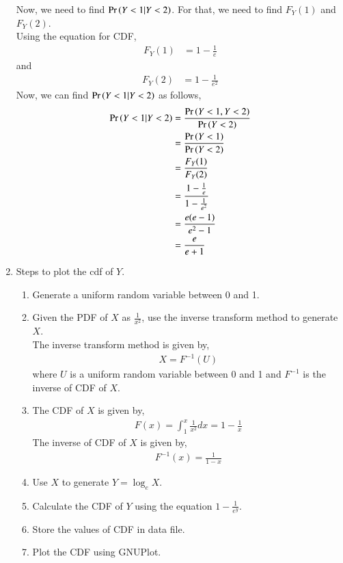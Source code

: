 \documentclass[journal,11pt]{IEEEtran}
\begin{document}
\begin{enumerate}
          Now, we need to find $\Pr\left(Y<1 | Y<2 \right)$.
          For that, we need to find $F_Y(1)$ and $F_Y(2)$.\\
          Using the equation for CDF,
          \begin{align}
              F_Y(1) & = 1 - \frac{1}{e}
          \end{align}
          and
          \begin{align}
              F_Y(2) & = 1 - \frac{1}{e^2}
          \end{align}
          Now, we can find $\Pr\left(Y<1 | Y<2 \right)$ as follows,
          \begin{align}
              \Pr\left(Y<1 | Y<2 \right) & = \frac{\Pr\left(Y<1 , Y<2\right)}{\Pr\left(Y<2\right)}           \\
                              & = \frac{\Pr\left(Y<1\right)}{\Pr\left(Y<2\right)}                 \\
                              & = \frac{F_Y(1)}{F_Y(2)}                     \\
                              & = \frac{1 - \frac{1}{e}}{1 - \frac{1}{e^2}} \\
                              & = \frac{e(e-1)}{e^2-1}                      \\
                              & = \frac{e}{e+1}
          \end{align}

    \item Steps to plot the cdf of $Y$.
          \begin{enumerate}
              \item Generate a uniform random variable between 0 and 1.
              \item Given the PDF of $X$ as $\frac{1}{x^2}$, use the inverse transform method to generate $X$.\\
                    The inverse transform method is given by,
                    \begin{align}
                        X = F^{-1}(U)
                    \end{align}
                    where $U$ is a uniform random variable between 0 and 1 and $F^{-1}$ is the inverse of CDF of $X$.
              \item The CDF of $X$ is given by,
                    \begin{align}
                        F(x) = \int_{1}^{x} \frac{1}{x^2} dx = 1 - \frac{1}{x}
                    \end{align}
              The inverse of CDF of $X$ is given by,
                    \begin{align}
                        F^{-1}(x) = \frac{1}{1-x}
                    \end{align}
              \item Use $X$ to generate $Y = \log_e X$.
              \item Calculate the CDF of $Y$ using the equation $1-\frac{1}{e^y}$.
              \item Store the values of CDF in data file.
              \item Plot the CDF using GNUPlot.
          \end{enumerate}
\end{enumerate}
\end{document}

